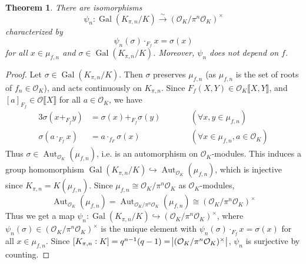 \documentclass[11pt]{article}
\theoremstyle{definition}
\theoremstyle{plain}
\newtheorem{theorem}[definition]{Theorem}
\theoremstyle{remark}
\DeclareMathOperator{\Gal}{Gal}
\DeclareMathOperator{\Aut}{Aut}
\newcommand{\cO}{\mathcal{O}}
\begin{document}
\begin{theorem}\label{thm:20_7}
    There are isomorphisms
    \begin{equation*}
        \psi_n : \Gal(K_{\pi,n}/K) \xrightarrow{\sim} (\cO_K / \pi^n \cO_K)^\times
    \end{equation*}
    characterized by
    \begin{equation*}
        \psi_n(\sigma) \cdot_{F_f} x = \sigma(x)
    \end{equation*}
    for all $x \in \mu_{f,n}$ and $\sigma \in \Gal(K_{\pi,n}/K)$. Moreover, $\psi_n$ does not depend on $f$.
\end{theorem}
\begin{proof}
    Let $\sigma \in \Gal(K_{\pi,n}/K)$. Then $\sigma$ preserves $\mu_{f,n}$ (as $\mu_{f,n}$ is the set of roots of $f_n \in \cO_K$), and acts continuously on $K_{\pi,n}$. Since $F_f(X, Y) \in \cO_K \llbracket X, Y \rrbracket$, and $[a]_{F_f} \in \cO \llbracket X \rrbracket$ for all $a \in \cO_K$, we have
    \begin{alignat*}{3}
        \sigma(x +_{F_f} y) &= \sigma(x) +_{F_f} \sigma(y) &&\qquad (\forall x, y \in \mu_{f,n})\\
        \sigma(a \cdot_{F_f} x) &= a \cdot_{f_F} \sigma(x) &&\qquad (\forall x \in \mu_{f,n}, a \in \cO_K)
    \end{alignat*}
    Thus $\sigma \in \Aut_{\cO_K}(\mu_{f,n})$, i.e. is an automorphism on $\cO_K$-modules. This induces a group homomorphism $\Gal(K_{\pi,n}/K) \hookrightarrow \Aut_{\cO_K}(\mu_{f,n})$, which is injective since $K_{\pi,n} = K(\mu_{f,n})$. Since $\mu_{f,n} \cong \cO_K / \pi^n \cO_K$ as $\cO_K$-modules,
    \begin{equation*}
        \Aut_{\cO_K}(\mu_{f,n}) = \Aut_{\cO_K / \pi^n \cO_K}(\mu_{f,n}) \cong (\cO_K / \pi^n \cO_K)^\times
    \end{equation*}
    Thus we get a map $\psi_n : \Gal(K_{\pi,n}/K) \hookrightarrow (\cO_K / \pi^n \cO_K)^\times$, where $\psi_n(\sigma) \in (\cO_K / \pi^n \cO_K)^\times$ is the unique element with $\psi_n(\sigma) \cdot_{F_f} x = \sigma(x)$ for all $x \in \mu_{f,n}$. Since $[K_{\pi,n} : K] = q^{n-1} (q-1) = \abs{(\cO_K / \pi^n \cO_K)^\times}$, $\psi_n$ is surjective by counting.


\end{proof}
\end{document}
